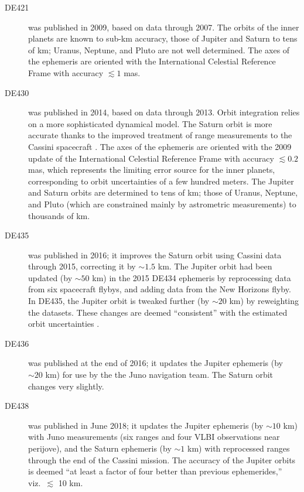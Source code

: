 \documentclass[reprint,
 amsmath,amssymb,
 aps,prd,floatfix,
]{revtex4-1}
\begin{document}
\begin{description}
%
\item[DE421 \cite{2009IPNPR.178C...1F}] was published in 2009, based on data through 2007. The orbits of the inner planets are known to sub-km accuracy, those of Jupiter and Saturn to tens of km; Uranus, Neptune, and Pluto are not well determined. The axes of the ephemeris are oriented with the International Celestial Reference Frame \cite{Ma_1998} with accuracy $\lesssim 1$ mas.
%
\item[DE430 \cite{2014IPNPR.196C...1F}] was published in 2014, based on data through 2013. Orbit integration relies on a more sophisticated dynamical model. The Saturn orbit is more accurate thanks to the improved treatment of range measurements to the Cassini spacecraft \cite{PhysRevD.89.102002}.
The axes of the ephemeris are oriented with the 2009 update of the International Celestial Reference Frame \cite{2015AJ....150...58F} with accuracy $\lesssim 0.2$ mas, which represents the limiting error source for the inner planets, corresponding to orbit uncertainties of a few hundred meters. The Jupiter and Saturn orbits are determined to tens of km; those of Uranus, Neptune, and Pluto (which are constrained mainly by astrometric measurements) to thousands of km. 
%
\item[DE435 \cite{de435}] was published in 2016; it improves the Saturn orbit using Cassini data through 2015, correcting it by $\sim 1.5$ km. The Jupiter orbit had been updated (by $\sim 50$ km) in the 2015 DE434 ephemeris \cite{de434} by reprocessing data from six spacecraft flybys, and adding data from the New Horizons flyby. In DE435, the Jupiter orbit is tweaked further (by $\sim 20$ km) by reweighting the datasets. These changes are deemed ``consistent'' with the estimated orbit uncertainties \cite{de434,de435}.
%
\item[DE436 \cite{de436}] was published at the end of 2016; it updates the Jupiter ephemeris (by $\sim 20$ km) for use by the the Juno navigation team. The Saturn orbit changes very slightly.
%
\item[DE438 \cite{de438}] was published in June 2018; it updates the Jupiter ephemeris (by $\sim 10$ km) with Juno measurements (six ranges and four VLBI observations near perijove), and the Saturn ephemeris (by $\sim 1$ km) with reprocessed ranges through the end of the Cassini mission. The accuracy of the Jupiter orbits is deemed ``at least a factor of four better than previous ephemerides,'' viz.\ $\lesssim$ 10 km.
%
\end{description}
\end{document}

